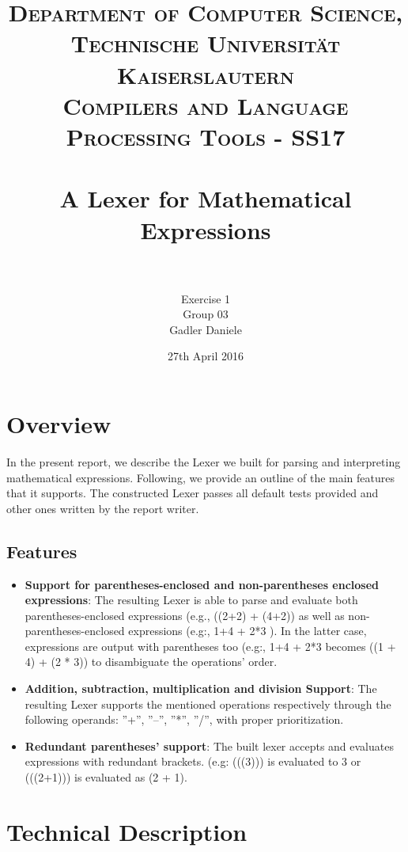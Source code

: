 \documentclass[paper=a4, fontsize=11pt]{scrartcl}
\title{
		\usefont{OT1}{bch}{b}{n}
		\normalfont \normalsize \textsc{Department of Computer Science, Technische Universit\"at Kaiserslautern\\
Compilers and Language Processing Tools - SS17
		} \\ [25pt]
		\horrule{0.5pt} \\[0.4cm]
		\huge A Lexer for Mathematical Expressions\\
		\horrule{2pt} \\[0.5cm]
}
\author{	
		Exercise 1\\
		Group 03\\
        Gadler Daniele\\[-1pt]		\normalsize
}
\date{27th April 2016}
\numberwithin{equation}{section}		%
\numberwithin{figure}{section}			%
\numberwithin{table}{section}				%
\begin{document}
\maketitle

\section{Overview}
In the present report, we describe the Lexer we built for parsing and interpreting mathematical expressions. Following, we provide an outline of the main features that it supports. The constructed Lexer passes all default tests provided and other ones written by the report writer. 
\subsection*{Features}

\begin{itemize}
	\item \textbf{Support for parentheses-enclosed and non-parentheses enclosed expressions}: The resulting Lexer is able to parse and evaluate both parentheses-enclosed expressions (e.g., ((2+2) + (4+2)) as well as non-parentheses-enclosed expressions (e.g:, 1+4 + 2*3 ). In the latter case, expressions are output with parentheses too (e.g:, 1+4 + 2*3 becomes ((1 + 4) + (2 * 3)) to disambiguate the operations' order. 
	\item \textbf{Addition, subtraction, multiplication and division Support}: The resulting Lexer supports the mentioned operations respectively through the following operands: ''+'', ''--'', ''*'', ''/'', with proper prioritization. 
	\item \textbf{Redundant parentheses' support}: The built lexer accepts and evaluates expressions with redundant brackets. (e.g: (((3))) is evaluated to 3 or (((2+1))) is evaluated as (2 + 1).
\end{itemize}


\section{Technical Description}

\end{document}
